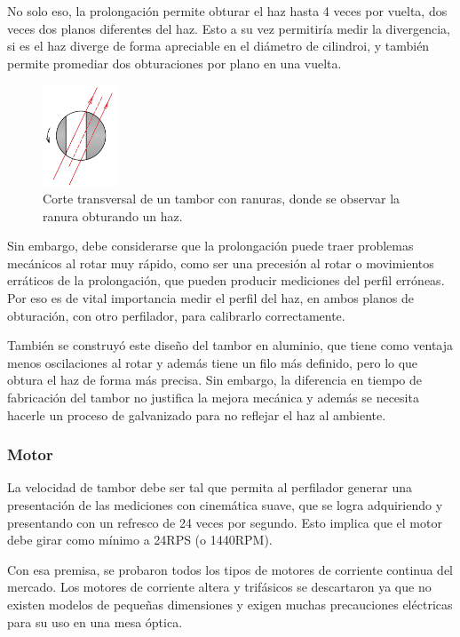 No solo eso, la prolongación permite obturar el haz hasta 4 veces por vuelta, dos veces dos planos diferentes del haz. Esto a su vez permitiría medir la divergencia, si es el haz diverge de forma apreciable en el diámetro de cilindroi, y también permite promediar dos obturaciones por plano en una vuelta. 

\begin{figure}[H]
\centering
\includegraphics[width=0.2\textwidth]{fig/perfilador/tambor_ranuras}
\caption{Corte transversal de un tambor con ranuras, donde se observar la ranura obturando un haz.}
\label{fig:perfilador/tambor_ranuras}
\end{figure}

Sin embargo, debe considerarse que la prolongación puede traer problemas mecánicos al rotar muy rápido, como ser una precesión al rotar o movimientos erráticos de la prolongación, que pueden producir mediciones del perfil erróneas. Por eso es de vital importancia medir el perfil del haz, en ambos planos de obturación, con otro perfilador, para calibrarlo correctamente.

También se construyó este diseño del tambor en aluminio, que tiene como ventaja menos oscilaciones al rotar y además tiene un filo más definido, pero lo que obtura el haz de forma más precisa. Sin embargo, la diferencia en tiempo de fabricación del tambor no justifica la mejora mecánica y además se necesita hacerle un proceso de galvanizado para no reflejar el haz al ambiente.


\subsubsection{Motor}

La velocidad de tambor debe ser tal que permita al perfilador generar una presentación de las mediciones con cinemática suave, que se logra adquiriendo y presentando con un refresco de 24 veces por segundo. Esto implica que el motor debe girar como mínimo a 24RPS (o 1440RPM).

Con esa premisa, se probaron todos los tipos de motores de corriente continua del mercado. Los motores de corriente altera y trifásicos se descartaron ya que no existen modelos de pequeñas dimensiones y exigen muchas precauciones eléctricas para su uso en una mesa óptica.

